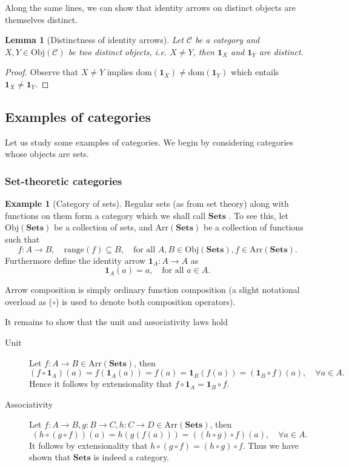 \documentclass[10pt,twoside,a4paper]{article}
\newcounter{theorem}
\theoremstyle{plain}
\newtheorem{lemma}[thm]{Lemma}
\theoremstyle{definition}
\newtheorem{example}{Example}[section]
\newcommand{\Domain}[1]{%
  \mathrm{dom}(#1)%
}
\newcommand{\Range}[1]{%
  \mathrm{range}(#1)%
}
\newcommand{\Id}[1]{%
  \ensuremath{\mathbf{1}_{#1}}%
}
\newcommand{\Obj}[1]{%
  \ensuremath{\mathrm{Obj}(#1)}%
}
\newcommand{\Arr}[1]{%
  \ensuremath{\mathrm{Arr}(#1)}%
}
\newcommand{\Catname}[1]{%
  \ensuremath{\mathbf{#1}}%
}
\newcommand{\Sets}[0]{\Catname{Sets}}
\begin{document}
Along the same lines, we can show that identity arrows on distinct
objects are themselves distinct.
\begin{lemma}[Distinctness of identity arrows]
  Let $\mathcal{C}$ be a category and $X,Y \in \Obj{\mathcal{C}}$ be
  two distinct objects, i.e. $X \neq Y$, then $\Id{X}$ and $\Id{Y}$
  are distinct.
\end{lemma}
\begin{proof}
  Observe that $X \neq Y$ implies
  $\Domain{\Id{X}} \neq \Domain{\Id{Y}}$ which entails
  $\Id{X} \neq \Id{Y}$.
\end{proof}

\subsection{Examples of categories}

Let us study some examples of categories. We begin by considering
categories whose objects are sets.

\subsubsection{Set-theoretic categories}

\begin{example}[Category of sets]
\label{ex:sets}
  Regular sets (as from set theory) along with functions on them form
  a category which we shall call \Sets{}. To see this, let
  $\Obj{\Sets}$ be a collection of sets, and $\Arr{\Sets}$ be a
  collection of functions such that
\[
  f : A \to B, \quad \Range{f} \subseteq B, \quad \text{for all } A,B \in \Obj{\Sets}, f \in \Arr{\Sets}.
\]
Furthermore define the identity arrow $\Id{A} : A \to A$ as
\[
   \Id{A}(a) = a, \quad \text{for all } a \in A.
\]

Arrow composition is simply ordinary function composition (a slight
notational overload as ($\circ$) is used to denote both composition
operators).

It remains to show that the unit and associativity laws hold
\begin{description}
  \item[Unit] Let $f : A \to B \in \Arr{\Sets}$, then
\[
  (f \circ \Id{A})(a) = f(\Id{A}(a)) = f(a) = \Id{B}(f(a)) = (\Id{B} \circ f)(a), \quad \forall a \in A.
\]
Hence it follows by extensionality that
$f \circ \Id{A} = \Id{B} \circ f$.

\item[Associativity] Let $f : A \to B, g : B \to C, h : C \to D \in \Arr{\Sets}$, then
\[
  (h \circ (g \circ f))(a) = h(g(f(a))) = ((h \circ g) \circ f)(a), \quad \forall a \in A.
\]
It follows by extensionality that
$h \circ (g \circ f) = (h \circ g) \circ f$. Thus we have shown that
\Sets{} is indeed a category.
\end{description}
\end{example}
\end{document}
